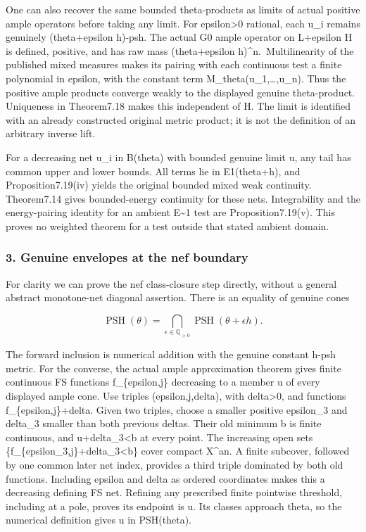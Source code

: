 \documentclass[
]{article}
\begin{document}
One can also recover the same bounded theta-products as limits of actual
positive ample operators before taking any limit. For
epsilon\textgreater0 rational, each u\_i remains genuinely
(theta+epsilon h)-psh. The actual G0 ample operator on L+epsilon H is
defined, positive, and has raw mass (theta+epsilon
h)\^{}n.~Multilinearity of the published mixed measures makes its
pairing with each continuous test a finite polynomial in epsilon, with
the constant term M\_theta(u\_1,\ldots,u\_n). Thus the positive ample
products converge weakly to the displayed genuine theta-product.
Uniqueness in Theorem7.18 makes this independent of H. The limit is
identified with an already constructed original metric product; it is
not the definition of an arbitrary inverse lift.

For a decreasing net u\_i in B(theta) with bounded genuine limit u, any
tail has common upper and lower bounds. All terms lie in E1(theta+h),
and Proposition7.19(iv) yields the original bounded mixed weak
continuity. Theorem7.14 gives bounded-energy continuity for these nets.
Integrability and the energy-pairing identity for an ambient
E\textasciitilde1 test are Proposition7.19(v). This proves no weighted
theorem for a test outside that stated ambient domain.

\subsubsection{3. Genuine envelopes at the nef
boundary}\label{genuine-envelopes-at-the-nef-boundary}

For clarity we can prove the nef class-closure step directly, without a
general abstract monotone-net diagonal assertion. There is an equality
of genuine cones

\[\operatorname{PSH}(\theta)=\bigcap_{\epsilon\in\mathbb Q_{>0}}\operatorname{PSH}(\theta+\epsilon h).\]

The forward inclusion is numerical addition with the genuine constant
h-psh metric. For the converse, the actual ample approximation theorem
gives finite continuous FS functions f\_\{epsilon,j\} decreasing to a
member u of every displayed ample cone. Use triples (epsilon,j,delta),
with delta\textgreater0, and functions f\_\{epsilon,j\}+delta. Given two
triples, choose a smaller positive epsilon\_3 and delta\_3 smaller than
both previous deltas. Their old minimum b is finite continuous, and
u+delta\_3\textless b at every point. The increasing open sets
\{f\_\{epsilon\_3,j\}+delta\_3\textless b\} cover compact X\^{}an. A
finite subcover, followed by one common later net index, provides a
third triple dominated by both old functions. Including epsilon and
delta as ordered coordinates makes this a decreasing defining FS net.
Refining any prescribed finite pointwise threshold, including at a pole,
proves its endpoint is u. Its classes approach theta, so the numerical
definition gives u in PSH(theta).
\end{document}
